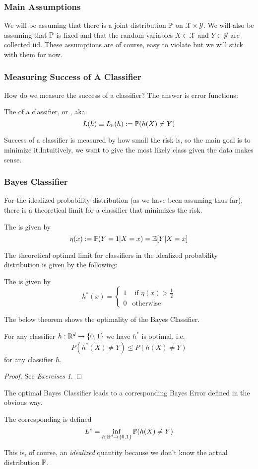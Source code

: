 \documentclass[11pt]{scrartcl}
\begin{document}
\subsubsection{Main Assumptions}

We will be assuming that there is a joint distribution $\mathbb{P}$ on $\mathcal{X} \times \mathcal{Y}$. We will also be assuming that $\mathbb{P}$ is fixed and that the random variables $X \in \mathcal{X}$ and $Y \in \mathcal{Y}$ are collected iid. These assumptions are of course, easy to violate but we will stick with them for now. 

\subsubsection{Measuring Success of A Classifier}
How do we measure the success of a classifier? The answer is error functions:
\begin{defn}
The  of a classifier, or , aka  $$L(h) \equiv L_{\mathbb{P}}(h) := \mathbb{P}(h(X) \ne Y)$$
\end{defn}
Success of a classifier is measured by how small the risk is, so the main goal is to minimize it.Intuitively, we want to give the most likely class given the data makes sense. 

\subsubsection{Bayes Classifier}
For the idealized probability distribution (as we have been assuming thus far), there is a theoretical limit for a classifier that minimizes the risk. \begin{defn}
The  is given by $$\eta(x) := \mathbb{P}(Y=1| X = x) = \mathbb{E}[Y|X=x]$$
\end{defn}
The theoretical optimal limit for classifiers in the idealized probability distribution is given by the following:
\begin{defn}
The  is given by $$h^*(x)=\begin{cases} 1 & \text{ if } \eta(x)>\frac{1}{2} \\ 0 & \text{otherwise}\end{cases}$$
\end{defn}

The below theorem shows the optimality of the Bayes Classifier.
\begin{thm}[BC Optimality]
For any classifier $h: \mathbb{R}^d \to \{0,1\}$ we have $h^*$ is optimal, i.e. $$P(h^*(X) \ne Y) \le P(h(X) \ne Y)$$ for any classifier $h$.
\end{thm}
\begin{proof}
See \textit{Exercises 1}.
\end{proof}
The optimal Bayes Classifier leads to a corresponding Bayes Error defined in the obvious way. 
\begin{defn}
The corresponding  is defined $$L^*=\inf_{h: \mathbb{R}^d \to \{0,1\}}\mathbb{P}(h(X) \ne Y)$$
\end{defn}
This is, of course, an \textit{idealized} quantity because we don't know the actual distribution $\mathbb{P}$. 
\end{document}
